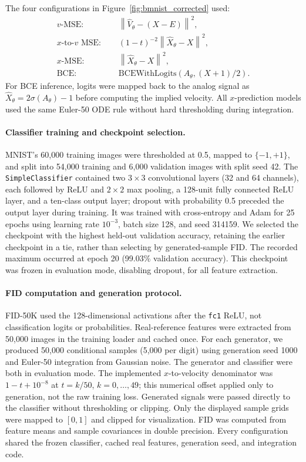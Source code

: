 \documentclass{article}
\theoremstyle{plain}
\theoremstyle{definition}
\theoremstyle{remark}
\newcommand{\norm}[1]{\left\lVert #1\right\rVert}
\begin{document}
The four configurations in Figure~\ref{fig:bmnist_corrected} used:
\begin{align}
v\text{-MSE: }&\quad \norm{\hat V_\theta-(X-E)}^2,\\
x\text{-to-}v\text{ MSE: }&\quad (1-t)^{-2}\norm{\hat X_\theta-X}^2,\\
x\text{-MSE: }&\quad \norm{\hat X_\theta-X}^2,\\
\mathrm{BCE: }&\quad \mathrm{BCEWithLogits}(A_\theta,(X+1)/2).
\end{align}
For BCE inference, logits were mapped back to the analog signal as $\hat X_\theta=2\sigma(A_\theta)-1$ before computing the implied velocity. All $x$-prediction models used the same Euler-50 ODE rule without hard thresholding during integration.

\paragraph{Classifier training and checkpoint selection.}
MNIST's 60,000 training images were thresholded at 0.5, mapped to $\{-1,+1\}$, and split into 54,000 training and 6,000 validation images with split seed 42. The \texttt{SimpleClassifier} contained two $3\times3$ convolutional layers (32 and 64 channels), each followed by ReLU and $2\times2$ max pooling, a 128-unit fully connected ReLU layer, and a ten-class output layer; dropout with probability 0.5 preceded the output layer during training. It was trained with cross-entropy and Adam for 25 epochs using learning rate $10^{-3}$, batch size 128, and seed 314159. We selected the checkpoint with the highest held-out validation accuracy, retaining the earlier checkpoint in a tie, rather than selecting by generated-sample FID. The recorded maximum occurred at epoch 20 (99.03\% validation accuracy). This checkpoint was frozen in evaluation mode, disabling dropout, for all feature extraction.

\paragraph{FID computation and generation protocol.}
FID-50K \citep{heusel2017gans} used the 128-dimensional activations after the \texttt{fc1} ReLU, not classification logits or probabilities. Real-reference features were extracted from 50,000 images in the training loader and cached once. For each generator, we produced 50,000 conditional samples (5,000 per digit) using generation seed 1000 and Euler-50 integration from Gaussian noise. The generator and classifier were both in evaluation mode. The implemented $x$-to-velocity denominator was $1-t+10^{-8}$ at $t=k/50$, $k=0,\ldots,49$; this numerical offset applied only to generation, not the raw training loss. Generated signals were passed directly to the classifier without thresholding or clipping. Only the displayed sample grids were mapped to $[0,1]$ and clipped for visualization. FID was computed from feature means and sample covariances in double precision. Every configuration shared the frozen classifier, cached real features, generation seed, and integration code.
\end{document}
